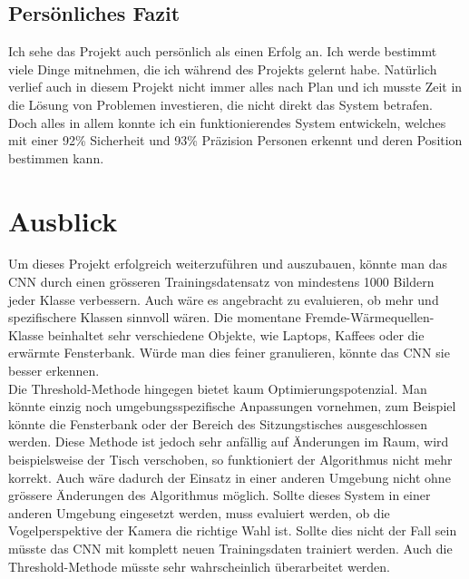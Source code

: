 \subsection{Persönliches Fazit}

Ich sehe das Projekt auch persönlich als einen Erfolg an. Ich werde bestimmt viele Dinge mitnehmen, die ich während des Projekts gelernt habe. Natürlich verlief auch in diesem Projekt nicht immer alles nach Plan und ich musste Zeit in die Lösung von Problemen investieren, die nicht direkt das System betrafen. Doch alles in allem konnte ich ein funktionierendes System entwickeln, welches mit einer 92\% Sicherheit und 93\% Präzision Personen erkennt und deren Position bestimmen kann.

\section{Ausblick}
Um dieses Projekt erfolgreich weiterzuführen und auszubauen, könnte man das \gls{CNN} durch einen grösseren Trainingsdatensatz von mindestens 1000 Bildern jeder Klasse verbessern. Auch wäre es angebracht zu evaluieren, ob mehr und spezifischere Klassen sinnvoll wären. Die momentane Fremde-Wärmequellen-Klasse beinhaltet sehr verschiedene Objekte, wie Laptops, Kaffees oder die erwärmte Fensterbank. Würde man dies feiner granulieren, könnte das \gls{CNN} sie besser erkennen.\\
Die Threshold-Methode hingegen bietet kaum Optimierungspotenzial. Man könnte einzig noch umgebungsspezifische Anpassungen vornehmen, zum Beispiel könnte die Fensterbank oder der Bereich des Sitzungstisches ausgeschlossen werden. Diese Methode ist jedoch sehr anfällig auf Änderungen im Raum, wird beispielsweise der Tisch verschoben, so funktioniert der Algorithmus nicht mehr korrekt. Auch wäre dadurch der Einsatz in einer anderen Umgebung nicht ohne grössere Änderungen des Algorithmus möglich. Sollte dieses System in einer anderen Umgebung eingesetzt werden, muss evaluiert werden, ob die Vogelperspektive der Kamera die richtige Wahl ist. Sollte dies nicht der Fall sein müsste das CNN mit komplett neuen Trainingsdaten trainiert werden. Auch die Threshold-Methode müsste sehr wahrscheinlich überarbeitet werden.
